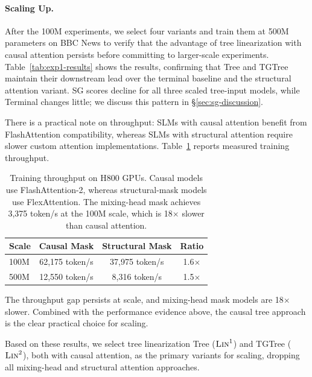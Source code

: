 \documentclass[11pt]{article}
\begin{document}
\paragraph{Scaling Up.} After the 100M experiments, we select four variants and train them at 500M parameters on BBC News to verify that the advantage of tree linearization with causal attention persists before committing to larger-scale experiments.
Table~\ref{tab:exp1-results} shows the results, confirming that Tree and TGTree maintain their downstream lead over the terminal baseline and the structural attention variant.
SG scores decline for all three scaled tree-input models, while Terminal changes little; we discuss this pattern in \S\ref{sec:sg-discussion}.

There is a practical note on throughput: SLMs with causal attention benefit from FlashAttention compatibility, whereas SLMs with structural attention require slower custom attention implementations.
Table~\ref{tab:efficiency} reports measured training throughput.

\begin{table}[tbp]
  \centering
  \fontsize{10pt}{12pt}\selectfont
  \setlength{\tabcolsep}{6pt}
  \begin{tabular}{lccc}
    \toprule
    Scale & Causal Mask & Structural Mask & Ratio \\
    \midrule
    100M & 62,175 token/s & 37,975 token/s & 1.6$\times$ \\
    500M & 12,550 token/s & 8,316 token/s & 1.5$\times$ \\
    \bottomrule
  \end{tabular}
  \caption{Training throughput on H800 GPUs. Causal models use FlashAttention-2, whereas structural-mask models use FlexAttention. The mixing-head mask achieves 3,375 token/s at the 100M scale, which is 18$\times$ slower than causal attention.}
  \label{tab:efficiency}
\end{table}

The throughput gap persists at scale, and mixing-head mask models are 18$\times$ slower.
Combined with the performance evidence above, the causal tree approach is the clear practical choice for scaling.

Based on these results, we select tree linearization Tree ($\textsc{Lin}^1$) and TGTree ($\textsc{Lin}^2$), both with causal attention, as the primary variants for scaling, dropping all mixing-head and structural attention approaches.
\end{document}
